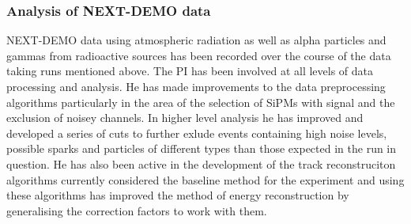 \documentclass[a4paper,11pt,oneside]{article}
\begin{document}
\subsubsection*{Analysis of NEXT-DEMO data}
NEXT-DEMO data using atmospheric radiation as well as alpha particles
and gammas from radioactive sources has been recorded over the course
of the data taking runs mentioned above. The PI has been involved at
all levels of data processing and analysis. He has made improvements
to the data preprocessing algorithms particularly in the area of the
selection of SiPMs with signal and the exclusion of noisey
channels. In higher level analysis he has improved and developed a
series of cuts to further exlude events containing high noise levels,
possible sparks and particles of different types than those expected
in the run in question. He has also been active in the development of
the track reconstruciton algorithms currently considered the baseline
method for the experiment and using these algorithms has improved the
method of energy reconstruction by generalising the correction factors
to work with them. %
\end{document}
